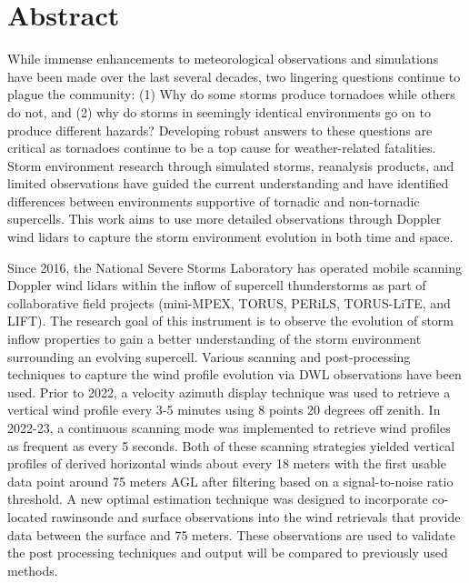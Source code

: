 \chapter*{Abstract}
\label{chap:Abstract}

While immense enhancements to meteorological observations and simulations have been made over the last several decades, two lingering questions continue to plague the community: (1) Why do some storms produce tornadoes while others do not, and (2) why do storms in seemingly identical environments go on to produce different hazards? Developing robust answers to these questions are critical as tornadoes continue to be a top cause for weather-related fatalities. Storm environment research through simulated storms, reanalysis products, and limited observations have guided the current understanding and have identified differences between environments supportive of tornadic and non-tornadic supercells. This work aims to use more detailed observations through Doppler wind lidars to capture the storm environment evolution in both time and space. 

Since 2016, the National Severe Storms Laboratory has operated mobile scanning Doppler wind lidars within the inflow of supercell thunderstorms as part of collaborative field projects (mini-MPEX, TORUS, PERiLS, TORUS-LiTE, and LIFT). The research goal of this instrument is to observe the evolution of storm inflow properties to gain a better understanding of the storm environment surrounding an evolving supercell. Various scanning and post-processing techniques to capture the wind profile evolution via DWL observations have been used. Prior to 2022, a velocity azimuth display technique was used to retrieve a vertical wind profile every 3-5 minutes using 8 points 20 degrees off zenith.  In 2022-23, a continuous scanning mode was implemented to retrieve wind profiles as frequent as every 5 seconds. Both of these scanning strategies yielded vertical profiles of derived horizontal winds about every 18 meters with the first usable data point around 75 meters AGL after filtering based on a signal-to-noise ratio threshold. A new optimal estimation technique was designed to incorporate co-located rawinsonde and surface observations into the wind retrievals that provide data between the surface and 75 meters. These observations are used to validate the post processing techniques and output will be compared to previously used methods.

